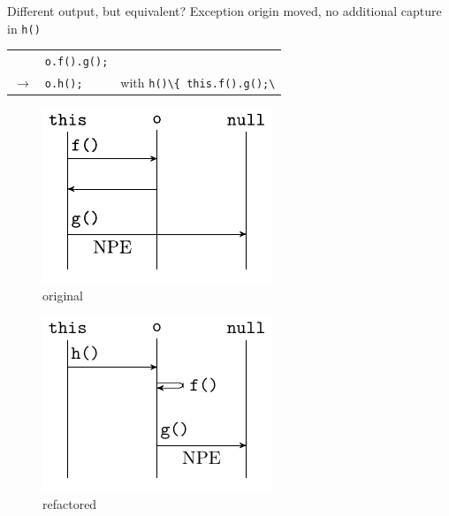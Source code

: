 \begin{frame}{Different output, but equivalent?}
Exception origin moved, no additional capture in \lstinline{h()}
\vspace{5mm}  
\begin{center}
  \begin{tabular}{rll}
    & \lstinline{o.f().g();}& \\
    $\rightarrow$ & \lstinline{o.h();} & with \lstinline{h()\{ this.f().g();\}}
  \end{tabular}
\end{center}
\vspace{1mm}       
\begin{minipage}{.49\textwidth}
\begin{figure}
  \includegraphics{imported/npe-before}
  \vspace{-1cm}
  \caption{original}
\end{figure}
\end{minipage}
\begin{minipage}{.49\textwidth}
\begin{figure}
  \includegraphics{imported/npe-after}
  \vspace{-1cm}
  \caption{refactored}
\end{figure}
\end{minipage}
\end{frame}

